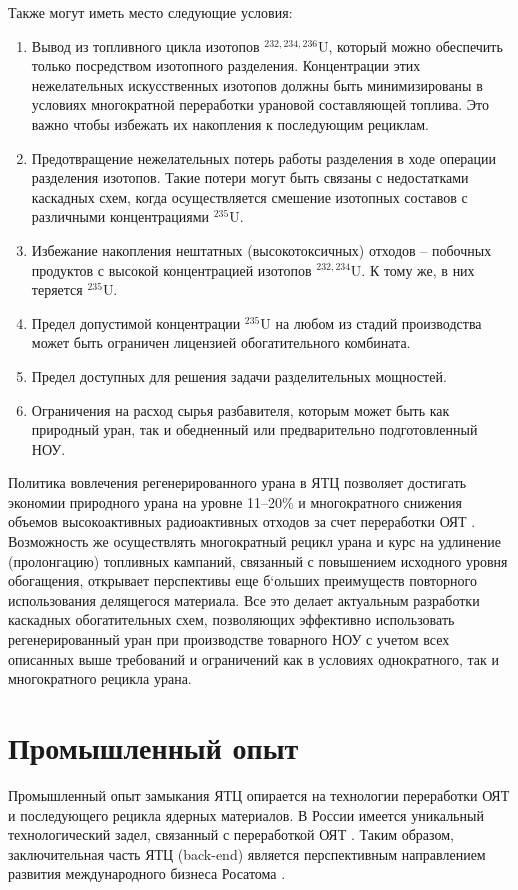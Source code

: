 Также могут иметь место следующие условия:
\begin{enumerate}
  \item Вывод из топливного цикла изотопов $^{232,234,236}$U, который можно обеспечить только посредством изотопного разделения. Концентрации этих нежелательных искусственных изотопов должны быть минимизированы в условиях многократной переработки урановой составляющей топлива. Это важно чтобы избежать их накопления к последующим рециклам.
  \item Предотвращение нежелательных потерь работы разделения в ходе операции разделения изотопов. Такие потери могут быть связаны с недостатками каскадных схем, когда осуществляется смешение изотопных составов с различными концентрациями $^{235}$U. 
  \item Избежание накопления нештатных (высокотоксичных) отходов -- побочных продуктов с высокой концентрацией изотопов $^{232,234}$U. К тому же, в них теряется $^{235}$U.
  \item Предел допустимой концентрации $^{235}$U на любом из стадий производства может быть ограничен лицензией обогатительного комбината.
  \item Предел доступных для решения задачи разделительных мощностей.
  \item Ограничения на расход сырья разбавителя, которым может быть как природный уран, так и обедненный или предварительно подготовленный НОУ.
\end{enumerate}

Политика вовлечения регенерированного урана в ЯТЦ позволяет достигать экономии природного урана на уровне 11--20\% и многократного снижения объемов высокоактивных радиоактивных отходов за счет переработки ОЯТ \cite{delculAnalysisReuseUranium2009}. Возможность же осуществлять многократный рецикл урана и курс на удлинение (пролонгацию) топливных кампаний, связанный с повышением исходного уровня обогащения, открывает перспективы еще б`ольших преимуществ повторного использования делящегося материала.
Все это делает актуальным разработки каскадных обогатительных схем, позволяющих эффективно использовать регенерированный уран при производстве товарного НОУ с учетом всех описанных выше требований и ограничений как в условиях однократного, так и многократного рецикла урана.


\section{Промышленный опыт}\label{sec:ch1/sec1}
Промышленный опыт замыкания ЯТЦ опирается на технологии переработки ОЯТ и последующего рецикла ядерных материалов.
В России имеется уникальный технологический задел, связанный с переработкой ОЯТ \cite{balihinSostoyaniiPerspektivahRazvitiya2018}.
Таким образом, заключительная часть ЯТЦ (back-end) является перспективным направлением развития международного бизнеса Росатома \cite{efimenkoProblemyPerspektivyRazvitiya2017}. 

